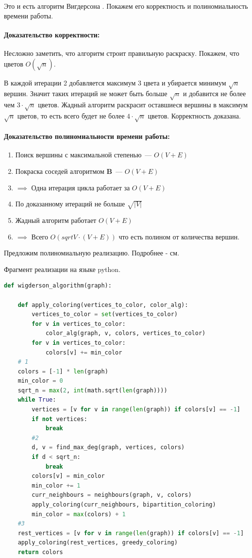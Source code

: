 \documentclass{article}
\begin{document}
Это и есть алгоритм Вигдерсона \citep{Wigd}. Покажем его корректность и полиномиальность времени работы.

\paragraph{Доказательство корректности:}
Несложно заметить, что алгоритм строит правильную раскраску. Покажем, что цветов $O(\sqrt{n})$.

В каждой итерации 2 добавляется максимум 3 цвета и убирается минимум $\sqrt{n}$ вершин. Значит таких итераций не может быть больше $\sqrt{n}$ и добавится не более чем $3 \cdot \sqrt{n}$ цветов. Жадный алгоритм раскрасит оставшиеся вершины в максимум $\sqrt{n}$ цветов, то есть всего будет не более $4 \cdot \sqrt{n}$ цветов. Корректность доказана. 

\paragraph{Доказательство полиномиальности времени работы:}

\begin{enumerate}
	\item Поиск вершины с максимальной степенью~--- $O(V + E)$
	\item Покраска соседей алгоритмом $\textbf{B}$~--- $O(V + E)$
	\item $\implies$ Одна итерация цикла работает за $O(V + E)$
	\item По доказанному итераций не больше $\sqrt{|V|}$
	\item Жадный алгоритм работает $O(V + E)$
	\item $\implies$ Всего $O(sqrt{V} \cdot (V + E))$ что есть полином от количества вершин.
\end{enumerate}


Предложим полиномиальную реализацию. Подробнее - см. \citep{github}

\newpage

Фрагмент реализации на языке python.

\begin{lstlisting}[language=Python]
def wigderson_algorithm(graph):

    def apply_coloring(vertices_to_color, color_alg):
        vertices_to_color = set(vertices_to_color)
        for v in vertices_to_color:
            color_alg(graph, v, colors, vertices_to_color)
        for v in vertices_to_color:
            colors[v] += min_color
    # 1
    colors = [-1] * len(graph)
    min_color = 0
    sqrt_n = max(2, int(math.sqrt(len(graph))))
    while True:
        vertices = [v for v in range(len(graph)) if colors[v] == -1]
        if not vertices:
            break
        #2
        d, v = find_max_deg(graph, vertices, colors)
        if d < sqrt_n:
            break
        colors[v] = min_color
        min_color += 1
        curr_neighbours = neighbours(graph, v, colors)
        apply_coloring(curr_neighbours, bipartition_coloring)
        min_color = max(colors) + 1
    #3
    rest_vertices = [v for v in range(len(graph)) if colors[v] == -1]
    apply_coloring(rest_vertices, greedy_coloring)
    return colors
\end{lstlisting}
\end{document}
